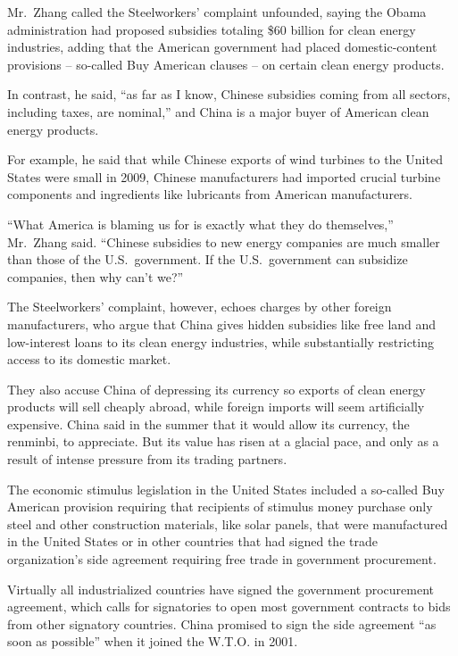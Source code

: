 ﻿\documentclass[12pt]{article}
\begin{document}
Mr.~Zhang called the Steelworkers' complaint unfounded, saying the Obama administration had proposed
subsidies totaling \$60 billion for clean energy industries, adding that the American government had
placed domestic-content provisions -- so-called Buy American clauses -- on certain clean energy
products.

In contrast, he said, ``as far as I know, Chinese subsidies coming from all sectors, including
taxes, are nominal,'' and China is a major buyer of American clean energy products.

For example, he said that while Chinese exports of wind turbines to the United States were small in
2009, Chinese manufacturers had imported crucial turbine components and ingredients like lubricants
from American manufacturers.

``What America is blaming us for is exactly what they do themselves,'' Mr.~Zhang said. ``Chinese
subsidies to new energy companies are much smaller than those of the U.S.~government. If the
U.S.~government can subsidize companies, then why can't we?''

The Steelworkers' complaint, however, echoes charges by other foreign manufacturers, who argue that
China gives hidden subsidies like free land and low-interest loans to its clean energy industries,
while substantially restricting access to its domestic market.

They also accuse China of depressing its currency so exports of clean energy products will sell
cheaply abroad, while foreign imports will seem artificially expensive. China said in the summer
that it would allow its currency, the renminbi, to appreciate. But its value has risen at a glacial
pace, and only as a result of intense pressure from its trading partners.

The economic stimulus legislation in the United States included a so-called Buy American provision
requiring that recipients of stimulus money purchase only steel and other construction materials,
like solar panels, that were manufactured in the United States or in other countries that had signed
the trade organization's side agreement requiring free trade in government procurement.

Virtually all industrialized countries have signed the government procurement agreement, which calls
for signatories to open most government contracts to bids from other signatory countries. China
promised to sign the side agreement ``as soon as possible'' when it joined the W.T.O. in 2001.
\end{document}

